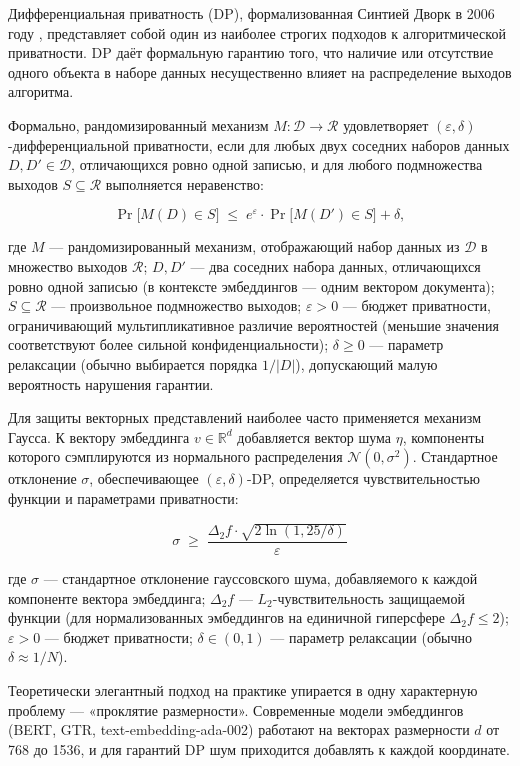 \documentclass[a4paper, 12pt, oneside, openany]{article}
\begin{document}
Диф\-фе\-рен\-ци\-аль\-ная при\-ват\-ность (DP), формализованная Синтией Дворк в 2006 году \cite{ref22}, представляет собой один из наиболее строгих подходов к алгоритмической приватности. DP даёт формальную гарантию того, что наличие или отсутствие одного объекта в наборе данных несущественно влияет на распределение выходов алгоритма.

Формально, рандомизированный механизм $M : \mathcal{D} \to \mathcal{R}$ удовлетворяет $(\varepsilon, \delta)$-дифференциальной приватности, если для любых двух соседних наборов данных $D, D' \in \mathcal{D}$, отличающихся ровно одной записью, и для любого подмножества выходов $S \subseteq \mathcal{R}$ выполняется неравенство:

\[
\Pr\bigl[ M(D) \in S \bigr] \;\leq\; e^{\varepsilon} \cdot \Pr\bigl[ M(D') \in S \bigr] + \delta,
\]

где $M$ --- рандомизированный механизм, отображающий набор данных из $\mathcal{D}$ в множество выходов $\mathcal{R}$; $D, D'$ --- два соседних набора данных, отличающихся ровно одной записью (в контексте эмбеддингов --- одним вектором документа); $S \subseteq \mathcal{R}$ --- произвольное подмножество выходов; $\varepsilon > 0$ --- бюджет приватности, ограничивающий мультипликативное различие вероятностей (меньшие значения соответствуют более сильной конфиденциальности); $\delta \geq 0$ --- параметр релаксации (обычно выбирается порядка $1/|D|$), допускающий малую вероятность нарушения гарантии.

Для защиты векторных представлений наиболее часто применяется механизм Гаусса. К вектору эмбеддинга $v \in \mathbb{R}^{d}$ добавляется вектор шума $\eta$, компоненты которого сэмплируются из нормального распределения $\mathcal{N}(0, \sigma^{2})$. Стандартное отклонение $\sigma$, обеспечивающее $(\varepsilon, \delta)$-DP, определяется чувствительностью функции и параметрами приватности:

\[
\sigma \;\geq\; \frac{\Delta_{2} f \cdot \sqrt{2 \ln(1{,}25/\delta)}}{\varepsilon}
\]

где $\sigma$ --- стандартное отклонение гауссовского шума, добавляемого к каждой компоненте вектора эмбеддинга; $\Delta_{2} f$ --- $L_{2}$-чувствительность защищаемой функции (для нормализованных эмбеддингов на единичной гиперсфере $\Delta_{2} f \leq 2$); $\varepsilon > 0$ --- бюджет приватности; $\delta \in (0, 1)$ --- параметр релаксации (обычно $\delta \approx 1/N$).

Теоретически элегантный подход на практике упирается в одну характерную проблему — «проклятие размерности». Современные модели эмбеддингов (BERT, GTR, text-embedding-ada-002) работают на векторах размерности $d$ от 768 до 1536, и для гарантий DP шум приходится добавлять к каждой координате.
\end{document}
